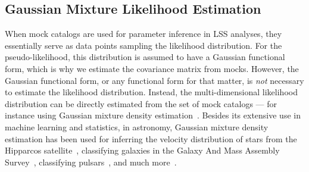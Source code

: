 \documentclass[12pt, letterpaper, preprint]{aastex6}
\newcommand{\lss}{{\small{LSS}}\xspace}
\begin{document}
\subsection{Gaussian Mixture Likelihood Estimation} \label{sec:gmm}
When mock catalogs are used for parameter inference in \lss analyses,
they essentially serve as data points sampling the likelihood distribution.
For the pseudo-likelihood, this distribution is assumed to have a
Gaussian functional form, which is why we estimate the covariance matrix 
from mocks. However, the Gaussian functional form, or any functional form for 
that matter, is \emph{not} necessary to estimate the likelihood distribution. 
Instead, the multi-dimensional likelihood distribution 
can be directly estimated from the set of mock catalogs --- for 
instance using Gaussian mixture density 
estimation~\citep{Press:1992:NRC:148286,9780471006268}. 
Besides its extensive use in machine learning and statistics, 
in astronomy, Gaussian mixture density estimation has been used for 
inferring the velocity distribution of stars from the Hipparcos 
satellite~\citep{bovy2011}, classifying galaxies in the Galaxy And Mass Assembly 
Survey~\citep{taylor2015}, classifying pulsars~\citep{lee2012}, and much more~\citep[see also][]{hogg2010,kuhn2017}. 
\end{document}

